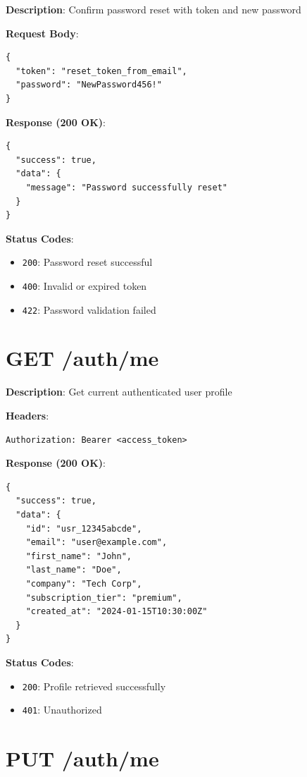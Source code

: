 \documentclass[12pt,a4paper]{report}
\begin{document}
\textbf{Description}: Confirm password reset with token and new password

\textbf{Request Body}:
\begin{lstlisting}
{
  "token": "reset_token_from_email",
  "password": "NewPassword456!"
}
\end{lstlisting}

\textbf{Response (200 OK)}:
\begin{lstlisting}
{
  "success": true,
  "data": {
    "message": "Password successfully reset"
  }
}
\end{lstlisting}

\textbf{Status Codes}:
\begin{itemize}
    \item \texttt{200}: Password reset successful
    \item \texttt{400}: Invalid or expired token
    \item \texttt{422}: Password validation failed
\end{itemize}

\section{GET /auth/me}

\textbf{Description}: Get current authenticated user profile

\textbf{Headers}:
\begin{lstlisting}
Authorization: Bearer <access_token>
\end{lstlisting}

\textbf{Response (200 OK)}:
\begin{lstlisting}
{
  "success": true,
  "data": {
    "id": "usr_12345abcde",
    "email": "user@example.com",
    "first_name": "John",
    "last_name": "Doe",
    "company": "Tech Corp",
    "subscription_tier": "premium",
    "created_at": "2024-01-15T10:30:00Z"
  }
}
\end{lstlisting}

\textbf{Status Codes}:
\begin{itemize}
    \item \texttt{200}: Profile retrieved successfully
    \item \texttt{401}: Unauthorized
\end{itemize}

\section{PUT /auth/me}
\end{document}

